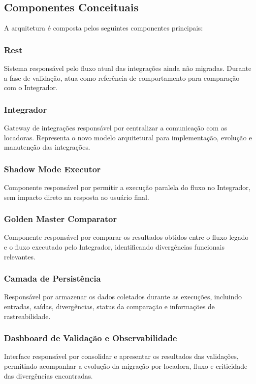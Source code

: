 \subsection{Componentes Conceituais}

A arquitetura é composta pelos seguintes componentes principais:

\subsubsection{Rest}
Sistema responsável pelo fluxo atual das integrações ainda não migradas. Durante a fase de validação, atua como referência de comportamento para comparação com o Integrador.

\subsubsection{Integrador}
Gateway de integrações responsável por centralizar a comunicação com as locadoras. Representa o novo modelo arquitetural para implementação, evolução e manutenção das integrações.

\subsubsection{Shadow Mode Executor}
Componente responsável por permitir a execução paralela do fluxo no Integrador, sem impacto direto na resposta ao usuário final.

\subsubsection{Golden Master Comparator}
Componente responsável por comparar os resultados obtidos entre o fluxo legado e o fluxo executado pelo Integrador, identificando divergências funcionais relevantes.

\subsubsection{Camada de Persistência}
Responsável por armazenar os dados coletados durante as execuções, incluindo entradas, saídas, divergências, status da comparação e informações de rastreabilidade.

\subsubsection{Dashboard de Validação e Observabilidade}
Interface responsável por consolidar e apresentar os resultados das validações, permitindo acompanhar a evolução da migração por locadora, fluxo e criticidade das divergências encontradas.

